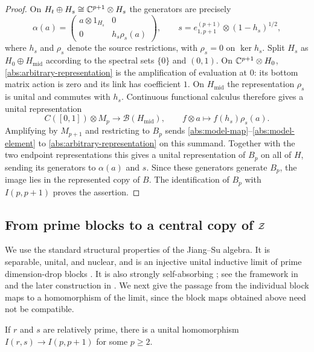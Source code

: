 \begin{proof}
On $H_t\oplus H_s\cong\mathbb C^{p+1}\otimes H_s$ the generators
are precisely
\begin{equation}\label{abs:arbitrary-representation}
 \alpha(a)=
 \begin{pmatrix}a\otimes1_{H_s}&0\\0&h_s\rho_s(a)\end{pmatrix},
 \qquad
 s=e_{1,p+1}^{(p+1)}\otimes(1-h_s)^{1/2},
\end{equation}
where $h_s$ and $\rho_s$ denote the source restrictions, with
$\rho_s=0$ on $\ker h_s$.
Split $H_s$ as
$H_0\oplus H_{\mathrm{mid}}$ according to the spectral sets
$\{0\}$ and $(0,1)$.  On $\mathbb C^{p+1}\otimes H_0$,
\eqref{abs:arbitrary-representation} is the amplification of
evaluation at $0$: its bottom matrix action is zero and its link
has coefficient $1$.
On $H_{\mathrm{mid}}$ the representation $\rho_s$ is unital and
commutes with $h_s$.  Continuous functional calculus therefore gives
a unital representation
\[
 C([0,1])\otimes M_p\longrightarrow\mathcal B(H_{\mathrm{mid}}),
 \qquad f\otimes a\longmapsto f(h_s)\rho_s(a).
\]
Amplifying by $M_{p+1}$ and restricting to $B_p$ sends
\eqref{abs:model-map}--\eqref{abs:model-element} to
\eqref{abs:arbitrary-representation} on this summand.
Together with the two endpoint representations this gives a unital
representation of $B_p$ on all of $H$, sending its generators to
$\alpha(a)$ and $s$.  Since these generators generate $B_p$, the
image lies in the represented copy of $B$.  The identification of
$B_p$ with $I(p,p+1)$ proves the assertion.
\end{proof}

\subsection{From prime blocks to a central copy of \texorpdfstring{$\mathcal Z$}{Z}}

We use the standard structural properties of the Jiang--Su algebra.
It is separable, unital, and nuclear, and is an injective unital
inductive limit of prime dimension-drop blocks
\cite[Proposition~2.5 and its proof]{JS1999}.
It is also strongly self-absorbing
\cite[Theorems~7.6 and~8.7]{JS1999}; see the framework in
\cite{TW2007} and the later construction in \cite{RW2010}.
We next give the passage from the
individual block maps to a homomorphism of the limit, since the block
maps obtained above need not be compatible.

\begin{lemma}\label{abs:prime-block-map}
If $r$ and $s$ are relatively prime, there is a unital homomorphism
$I(r,s)\to I(p,p+1)$ for some $p\ge2$.
\end{lemma}

